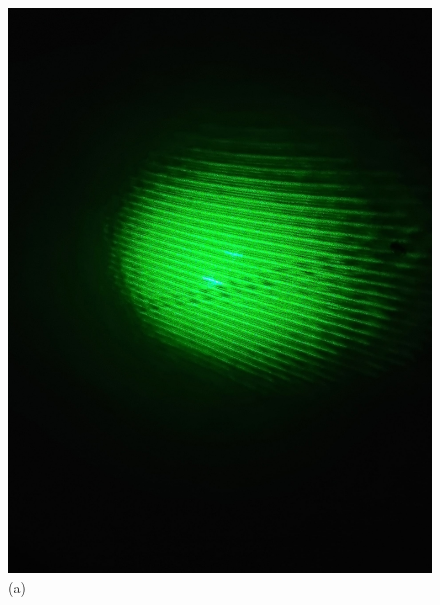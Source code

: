 \documentclass[a4paper,12pt]{article}
\begin{document}
\begin{figure}[H]
    \centering
    \begin{minipage}[b]{0.3\textwidth}
        \includegraphics[scale=0.08]{pic_1.png}
        \caption*{(a)}
    \end{minipage}
    \begin{minipage}[b]{0.3\textwidth}

\end{minipage}
\end{figure}
\end{document}
